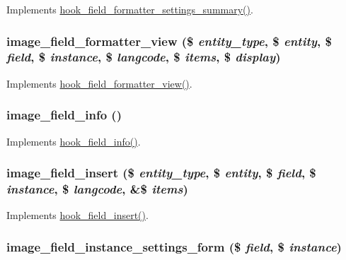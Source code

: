Implements \hyperlink{group__field__types_ga0cdef0fb8588dde07292df1b86f06d81}{hook\_\-field\_\-formatter\_\-settings\_\-summary()}. \hypertarget{image_8field_8inc_a808448070b848b1212a51f4b18ce5122}{
\subsubsection[{image\_\-field\_\-formatter\_\-view}]{\setlength{\rightskip}{0pt plus 5cm}image\_\-field\_\-formatter\_\-view (\$ {\em entity\_\-type}, \/  \$ {\em entity}, \/  \$ {\em field}, \/  \$ {\em instance}, \/  \$ {\em langcode}, \/  \$ {\em items}, \/  \$ {\em display})}}
\label{image_8field_8inc_a808448070b848b1212a51f4b18ce5122}
Implements \hyperlink{group__field__formatter_gaa588d99481fa147a1c88416e55fdfad6}{hook\_\-field\_\-formatter\_\-view()}. \hypertarget{image_8field_8inc_a28bbfd28b358636c68969c9f1d635f98}{
\subsubsection[{image\_\-field\_\-info}]{\setlength{\rightskip}{0pt plus 5cm}image\_\-field\_\-info ()}}
\label{image_8field_8inc_a28bbfd28b358636c68969c9f1d635f98}
Implements \hyperlink{group__field__types_gad3eb779f26f41b520f19af011ece3eb1}{hook\_\-field\_\-info()}. \hypertarget{image_8field_8inc_ae627251982fda4938b22119e9760a7b4}{
\subsubsection[{image\_\-field\_\-insert}]{\setlength{\rightskip}{0pt plus 5cm}image\_\-field\_\-insert (\$ {\em entity\_\-type}, \/  \$ {\em entity}, \/  \$ {\em field}, \/  \$ {\em instance}, \/  \$ {\em langcode}, \/  \&\$ {\em items})}}
\label{image_8field_8inc_ae627251982fda4938b22119e9760a7b4}
Implements \hyperlink{group__field__types_ga2d29ec2e4a47170d5aaaf41bdd4813df}{hook\_\-field\_\-insert()}. \hypertarget{image_8field_8inc_a0fb703ddacaa5e38cdc62b33786aecac}{
\subsubsection[{image\_\-field\_\-instance\_\-settings\_\-form}]{\setlength{\rightskip}{0pt plus 5cm}image\_\-field\_\-instance\_\-settings\_\-form (\$ {\em field}, \/  \$ {\em instance})}}
